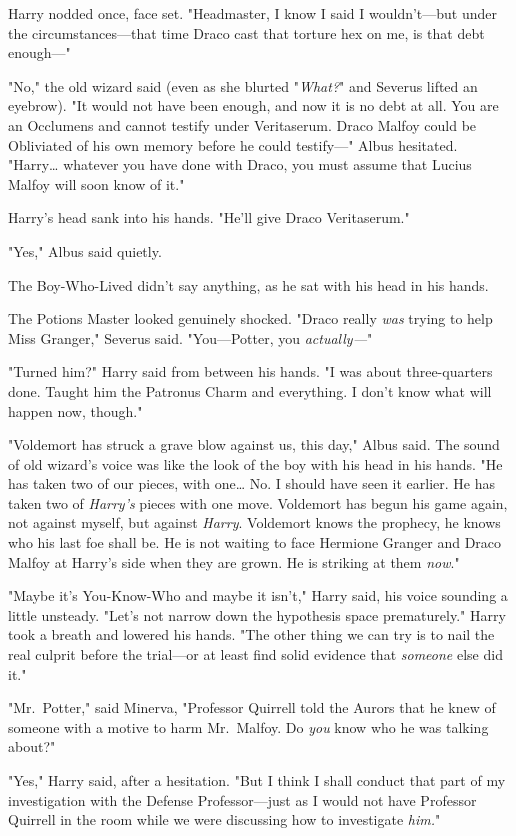 Harry nodded once, face set. "Headmaster, I know I said I wouldn't---but under the circumstances---that time Draco cast that torture hex on me, is that debt enough---"

"No," the old wizard said (even as she blurted "\emph{What?}" and Severus lifted an eyebrow). "It would not have been enough, and now it is no debt at all. You are an Occlumens and cannot testify under Veritaserum. Draco Malfoy could be Obliviated of his own memory before he could testify---" Albus hesitated. "Harry{\ldots} whatever you have done with Draco, you must assume that Lucius Malfoy will soon know of it."

Harry's head sank into his hands. "He'll give Draco Veritaserum."

"Yes," Albus said quietly.

The Boy-Who-Lived didn't say anything, as he sat with his head in his hands.

The Potions Master looked genuinely shocked. "Draco really \emph{was} trying to help Miss Granger," Severus said. "You---Potter, you \emph{actually---}"

"Turned him?" Harry said from between his hands. "I was about three-quarters done. Taught him the Patronus Charm and everything. I don't know what will happen now, though."

"Voldemort has struck a grave blow against us, this day," Albus said. The sound of old wizard's voice was like the look of the boy with his head in his hands. "He has taken two of our pieces, with one{\ldots} No. I should have seen it earlier. He has taken two of \emph{Harry's} pieces with one move. Voldemort has begun his game again, not against myself, but against \emph{Harry}. Voldemort knows the prophecy, he knows who his last foe shall be. He is not waiting to face Hermione Granger and Draco Malfoy at Harry's side when they are grown. He is striking at them \emph{now}."

"Maybe it's You-Know-Who and maybe it isn't," Harry said, his voice sounding a little unsteady. "Let's not narrow down the hypothesis space prematurely." Harry took a breath and lowered his hands. "The other thing we can try is to nail the real culprit before the trial---or at least find solid evidence that \emph{someone} else did it."

"Mr.~Potter," said Minerva, "Professor Quirrell told the Aurors that he knew of someone with a motive to harm Mr.~Malfoy. Do \emph{you} know who he was talking about?"

"Yes," Harry said, after a hesitation. "But I think I shall conduct that part of my investigation with the Defense Professor---just as I would not have Professor Quirrell in the room while we were discussing how to investigate \emph{him.}"


